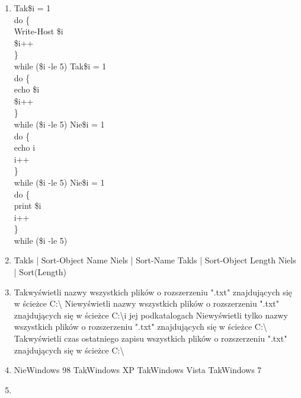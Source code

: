 \begin{enumerate}
		\newpage
		\item {}%
		{Tak}{\$i = 1\\
			do \{\\
				Write-Host \$i\\
				\$i++\\
			\}\\
			while (\$i -le 5)}%
		{Tak}{\$i = 1\\
			do \{\\
				echo \$i\\
				\$i++\\
			\}\\
			while (\$i -le 5)}%
		{Nie}{\$i = 1\\
			do \{\\
				echo i\\
				i++\\
			\}\\
			while (\$i -le 5)}%
		{Nie}{\$i = 1\\
			do \{\\
				print \$i\\
				i++\\
			\}\\
			while (\$i -le 5)}
		\item {}%
		{Tak}{ls | Sort-Object Name}%
		{Nie}{ls | Sort-Name}%
		{Tak}{ls | Sort-Object Length}%
		{Nie}{ls | Sort(Length)}
		\item {}%
		{Tak}{wyświetli nazwy wszystkich plików o rozszerzeniu ".txt" znajdujących się w ścieżce C:\textbackslash}%
		{Nie}{wyświetli nazwy wszystkich plików o rozszerzeniu ".txt" znajdujących się w ścieżce C:\textbackslash i jej podkatalogach}%
		{Nie}{wyświetli tylko nazwy wszystkich plików o rozszerzeniu ".txt" znajdujących się w ścieżce C:\textbackslash}%
		{Tak}{wyświetli czas ostatniego zapisu wszystkich plików o rozszerzeniu ".txt" znajdujących się w ścieżce C:\textbackslash}
		\item {}%
		{Nie}{Windows 98}%
		{Tak}{Windows XP}%
		{Tak}{Windows Vista}%
		{Tak}{Windows 7}
		\item {}
\end{enumerate}
